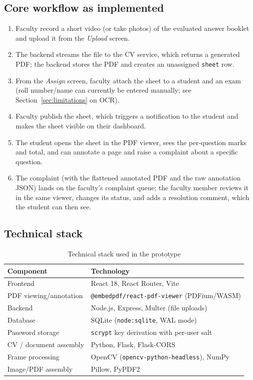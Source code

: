 \documentclass[11pt,a4paper]{article}
\begin{document}
\subsection{Core workflow as implemented}

\begin{enumerate}[leftmargin=0.7cm]
  \item Faculty record a short video (or take photos) of the evaluated answer
    booklet and upload it from the \emph{Upload} screen.
  \item The backend streams the file to the CV service, which returns a
    generated PDF; the backend stores the PDF and creates an unassigned
    \texttt{sheet} row.
  \item From the \emph{Assign} screen, faculty attach the sheet to a
    student and an exam (roll number/name can currently be entered manually;
    see Section~\ref{sec:limitations} on OCR).
  \item Faculty publish the sheet, which triggers a notification to the
    student and makes the sheet visible on their dashboard.
  \item The student opens the sheet in the PDF viewer, sees the per-question
    marks and total, and can annotate a page and raise a complaint about a
    specific question.
  \item The complaint (with the flattened annotated PDF and the raw
    annotation JSON) lands on the faculty's complaint queue; the faculty
    member reviews it in the same viewer, changes its status, and adds a
    resolution comment, which the student can then see.
\end{enumerate}

\subsection{Technical stack}

\begin{table}[h!]
\centering
\begin{tabular}{p{} p{}}
\toprule
\textbf{Component} & \textbf{Technology} \\
\midrule
Frontend & React 18, React Router, Vite \\
PDF viewing/annotation & \texttt{@embedpdf/react-pdf-viewer} (PDFium/WASM) \\
Backend & Node.js, Express, Multer (file uploads) \\
Database & SQLite (\texttt{node:sqlite}, WAL mode) \\
Password storage & \texttt{scrypt} key derivation with per-user salt \\
CV / document assembly & Python, Flask, Flask-CORS \\
Frame processing & OpenCV (\texttt{opencv-python-headless}), NumPy \\
Image/PDF assembly & Pillow, PyPDF2 \\
\bottomrule
\end{tabular}
\caption{Technical stack used in the prototype}
\end{table}
\end{document}
